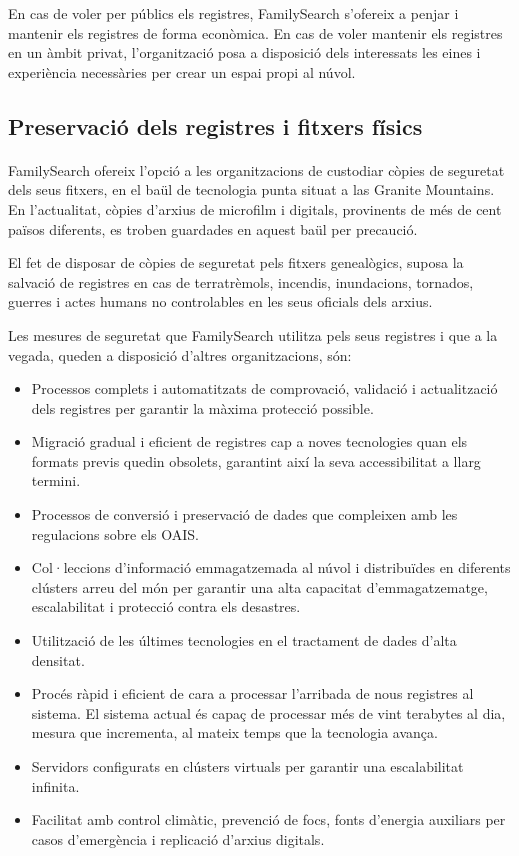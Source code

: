     En cas de voler per públics els registres, FamilySearch s’ofereix a penjar i mantenir els registres de forma econòmica. En cas de voler mantenir els registres en un àmbit privat, l’organització posa a disposició dels interessats les eines i experiència necessàries per crear un espai propi al núvol.


    \subsection{Preservació dels registres i fitxers físics}

    \paragraph{}
    FamilySearch ofereix l’opció a les organitzacions de custodiar còpies de seguretat dels seus fitxers, en el baül de tecnologia punta situat a las Granite Mountains. En l'actualitat, còpies d’arxius de microfilm i digitals, provinents de més de cent països diferents, es troben guardades en aquest baül per precaució.

    El fet de disposar de còpies de seguretat pels fitxers genealògics, suposa la salvació de registres en cas de terratrèmols, incendis, inundacions, tornados, guerres i actes humans no controlables en les seus oficials dels arxius.

    Les mesures de seguretat que FamilySearch utilitza pels seus registres i que a la vegada, queden a disposició d’altres organitzacions, són:

    \begin{itemize}
        \item Processos complets i automatitzats de comprovació, validació i actualització dels registres per garantir la màxima protecció possible.
        \item Migració gradual i eficient de registres cap a noves tecnologies quan els formats previs quedin obsolets, garantint així la seva accessibilitat a llarg termini.
        \item Processos de conversió i preservació de dades que compleixen amb les regulacions sobre els \gls{OAIS}.
        \item Col·leccions d’informació emmagatzemada al núvol i distribuïdes en diferents clústers arreu del món per garantir una alta capacitat d’emmagatzematge, escalabilitat i protecció contra els desastres.
        \item Utilització de les últimes tecnologies en el tractament de dades d'alta densitat.
        \item Procés ràpid i eficient de cara a processar l'arribada de nous registres al sistema. El sistema actual és capaç de processar més de vint terabytes al dia, mesura que incrementa, al mateix temps que la tecnologia avança.
        \item Servidors configurats en clústers virtuals per garantir una escalabilitat infinita.
        \item Facilitat amb control climàtic, prevenció de focs, fonts d’energia auxiliars per casos d’emergència i replicació d’arxius digitals.
    \end{itemize}


